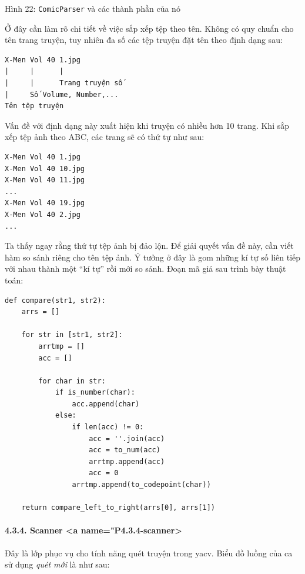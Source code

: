 \documentclass[
]{article}
\begin{document}
Hình 22: \texttt{ComicParser} và các thành phần của nó

Ở đây cần làm rõ chi tiết về việc sắp xếp tệp theo tên. Không có quy
chuẩn cho tên trang truyện, tuy nhiên đa số các tệp truyện đặt tên theo
định dạng sau:

\begin{verbatim}
X-Men Vol 40 1.jpg
|     |      |
|     |      Trang truyện số
|     Số Volume, Number,...
Tên tệp truyện
\end{verbatim}

Vấn đề với định dạng này xuất hiện khi truyện có nhiều hơn 10 trang. Khi
sắp xếp tệp ảnh theo ABC, các trang sẽ có thứ tự như sau:

\begin{verbatim}
X-Men Vol 40 1.jpg
X-Men Vol 40 10.jpg
X-Men Vol 40 11.jpg
...
X-Men Vol 40 19.jpg
X-Men Vol 40 2.jpg
...
\end{verbatim}

Ta thấy ngay rằng thứ tự tệp ảnh bị đảo lộn. Để giải quyết vấn đề này,
cần viết hàm so sánh riêng cho tên tệp ảnh. Ý tưởng ở đây là gom những
kí tự số liên tiếp với nhau thành một ``kí tự'' rồi mới so sánh. Đoạn mã
giả sau trình bày thuật toán:

\begin{verbatim}
def compare(str1, str2):
    arrs = []

    for str in [str1, str2]:
        arrtmp = []
        acc = []

        for char in str:
            if is_number(char):
                acc.append(char)
            else:
                if len(acc) != 0:
                    acc = ''.join(acc)
                    acc = to_num(acc)
                    arrtmp.append(acc)
                    acc = 0
                arrtmp.append(to_codepoint(char))

    return compare_left_to_right(arrs[0], arrs[1])
\end{verbatim}

\hypertarget{scanner-a-namep4.3.4-scanner}{%
\paragraph{4.3.4. Scanner \textless a
name="P4.3.4-scanner\textgreater{}}\label{scanner-a-namep4.3.4-scanner}}

Đây là lớp phục vụ cho tính năng quét truyện trong yacv. Biểu đồ luồng
của ca sử dụng \emph{quét mới} là như sau:
\end{document}
